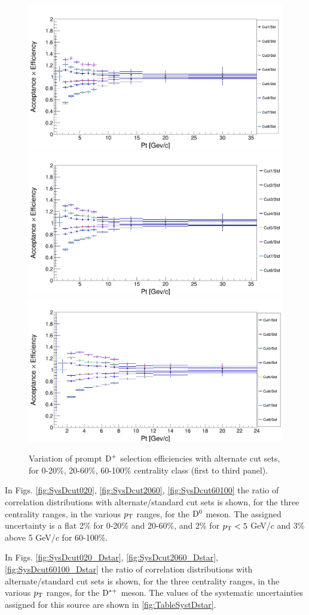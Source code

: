 \begin{figure}
\centering
{\includegraphics[width=0.48\linewidth]{Centrality_DPlus/Dplus/Eff_cmp/ratio_0_20.png}}
{\includegraphics[width=0.48\linewidth]{Centrality_DPlus/Dplus/Eff_cmp/ratio_cuts_20_60.png}}
{\includegraphics[width=0.48\linewidth]{Centrality_DPlus/Dplus/Eff_cmp/ratio_60_100.png}}
\caption{Variation of prompt ${\rm D^+}$ selection efficiencies with alternate cut sets, for 0-20\%, 20-60\%, 60-100\% centrality class (first to third panel).}
\label{fig:EffVariations_Dplus}
\end{figure}

In Figs. \ref{fig:SysDcut020}, \ref{fig:SysDcut2060}, \ref{fig:SysDcut60100} the ratio of correlation distributions with alternate/standard cut sets is shown, for the three centrality ranges, in the various $p_{\rm T}$ ranges, for the ${\rm D^0}$ meson.
The assigned uncertainty is a flat 2\% for 0-20\% and 20-60\%, and 2\% for $p_{\rm T} < 5$ GeV/$c$ and 3\% above 5 GeV/$c$ for 60-100\%.

In Figs. \ref{fig:SysDcut020_Dstar}, \ref{fig:SysDcut2060_Dstar}, \ref{fig:SysDcut60100_Dstar} the ratio of correlation distributions with alternate/standard cut sets is shown, for the three centrality ranges, in the various $p_{\rm T}$ ranges, for the ${\rm D^{*+}}$ meson. The values of the systematic uncertainties assigned for this source are shown in \ref{fig:TableSystDstar}.


